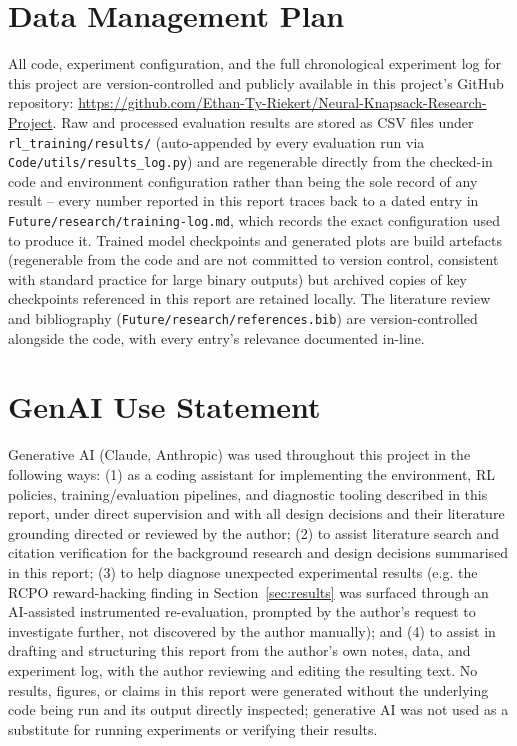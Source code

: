 \documentclass[12pt]{article}
\begin{document}
\section{Data Management Plan}
All code, experiment configuration, and the full chronological experiment log for this project are version-controlled and publicly available in this project's GitHub repository: \url{https://github.com/Ethan-Ty-Riekert/Neural-Knapsack-Research-Project}. Raw and processed evaluation results are stored as CSV files under \texttt{rl\_training/results/} (auto-appended by every evaluation run via \texttt{Code/utils/results\_log.py}) and are regenerable directly from the checked-in code and environment configuration rather than being the sole record of any result -- every number reported in this report traces back to a dated entry in \texttt{Future/research/training-log.md}, which records the exact configuration used to produce it. Trained model checkpoints and generated plots are build artefacts (regenerable from the code and are not committed to version control, consistent with standard practice for large binary outputs) but archived copies of key checkpoints referenced in this report are retained locally. The literature review and bibliography (\texttt{Future/research/references.bib}) are version-controlled alongside the code, with every entry's relevance documented in-line.

\section{GenAI Use Statement}
Generative AI (Claude, Anthropic) was used throughout this project in the following ways: (1) as a coding assistant for implementing the environment, RL policies, training/evaluation pipelines, and diagnostic tooling described in this report, under direct supervision and with all design decisions and their literature grounding directed or reviewed by the author; (2) to assist literature search and citation verification for the background research and design decisions summarised in this report; (3) to help diagnose unexpected experimental results (e.g. the RCPO reward-hacking finding in Section~\ref{sec:results} was surfaced through an AI-assisted instrumented re-evaluation, prompted by the author's request to investigate further, not discovered by the author manually); and (4) to assist in drafting and structuring this report from the author's own notes, data, and experiment log, with the author reviewing and editing the resulting text. No results, figures, or claims in this report were generated without the underlying code being run and its output directly inspected; generative AI was not used as a substitute for running experiments or verifying their results.

\newpage


\end{document}
